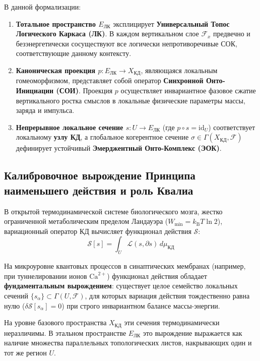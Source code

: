 \documentclass[12pt,a4paper]{article}
\begin{document}
В данной формализации:
\begin{enumerate}
    \item \textbf{Тотальное пространство $E_{\text{ЛК}}$} эксплицирует \textbf{Универсальный Топос Логического Каркаса (ЛК)}. В каждом вертикальном слое $\mathcal{F}_x$ предвечно и безэнергетически сосуществуют все логически непротиворечивые СОК, соответствующие данному контексту.
    \item \textbf{Каноническая проекция $p: E_{\text{ЛК}} \to X_{\text{КД}}$}, являющаяся локальным гомеоморфизмом, представляет собой оператор \textbf{Синхронной Онто-Инициации (СОИ)}. Проекция $p$ осуществляет инвариантное фазовое сжатие вертикального ростка смыслов в локальные физические параметры массы, заряда и импульса.
    \item \textbf{Непрерывное локальное сечение $s: U \to E_{\text{ЛК}}$} (где $p \circ s = \text{id}_U$) соответствует локальному \textbf{узлу КД}, а глобальное когерентное сечение $\sigma \in \Gamma(X_{\text{КД}}, \mathcal{F})$ дефинирует устойчивый \textbf{Эмерджентный Онто-Комплекс (ЭОК)}.
\end{enumerate}

\subsection{Калибровочное вырождение Принципа наименьшего действия и роль Квалиа}
В открытой термодинамической системе биологического мозга, жестко ограниченной метаболическим пределом Ландауэра ($W_{\min} = k_{\text{B}}T \ln 2$), вариационный оператор КД вычисляет функционал действия $\mathcal{S}$:
\begin{equation}
\mathcal{S}[s] = \int_{U} \mathcal{L}(s, \partial s) \, d\mu_{\text{КД}}
\end{equation}

На микроуровне квантовых процессов в синаптических мембранах (например, при туннелировании ионов $\text{Ca}^{2+}$) функционал действия обладает \textbf{фундаментальным вырождением}: существует целое семейство локальных сечений $\{s_\alpha\} \subset \Gamma(U, \mathcal{F})$, для которых вариация действия тождественно равна нулю ($\delta \mathcal{S}[s_\alpha] = 0$) при строго инвариантном балансе массы-энергии.

На уровне базового пространства $X_{\text{КД}}$ эти сечения термодинамически неразличимы. В этальном пространстве $E_{\text{ЛК}}$ это вырождение выражается как наличие множества параллельных топологических листов, накрывающих один и тот же регион $U$.
\end{document}
